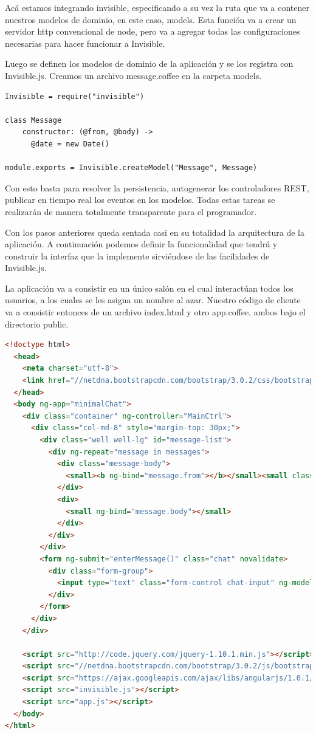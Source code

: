 \documentclass[doc,helv,longtable]{article}
\begin{document}
Acá estamos integrando invisible, especificando a su vez la ruta que va a contener nuestros modelos de dominio, en este caso, models. Esta función va a crear un servidor http convencional de node, pero va a agregar todas las configuraciones necesarias para hacer funcionar a Invisible.

Luego se definen los modelos de dominio de la aplicación y se los registra con Invisible.js. Creamos un archivo message.coffee en la carpeta models.

\begin{lstlisting}
Invisible = require("invisible")

class Message
    constructor: (@from, @body) ->
      @date = new Date()

module.exports = Invisible.createModel("Message", Message)
\end{lstlisting}

Con esto basta para resolver la persistencia, autogenerar los controladores REST, publicar en tiempo real los eventos en los modelos. Todas estas tareas se realizarán de manera totalmente transparente para el programador. 

Con los pasos anteriores queda sentada casi en su totalidad la arquitectura de la aplicación. A continuación podemos definir la funcionalidad que tendrá y construir la interfaz que la implemente sirviéndose de las facilidades de Invisible.js.

La aplicación va a consistir en un único salón en el cual interactúan todos los usuarios, a los cuales se les asigna un nombre al azar. Nuestro código de cliente va a consistir entonces de un archivo index.html y otro app.coffee, ambos bajo el directorio public.

\begin{lstlisting}[language=html]
<!doctype html>
  <head>
    <meta charset="utf-8">
    <link href="//netdna.bootstrapcdn.com/bootstrap/3.0.2/css/bootstrap.min.css" rel="stylesheet">
  </head>
  <body ng-app="minimalChat">
    <div class="container" ng-controller="MainCtrl">
      <div class="col-md-8" style="margin-top: 30px;">
        <div class="well well-lg" id="message-list"> 
          <div ng-repeat="message in messages">
            <div class="message-body">
              <small><b ng-bind="message.from"></b></small><small class="pull-right text-muted" ng-bind="message.date|date:'short'"></small><br/>
            </div>
            <div>
              <small ng-bind="message.body"></small>
            </div>
          </div>
        </div>
        <form ng-submit="enterMessage()" class="chat" novalidate>
          <div class="form-group">
            <input type="text" class="form-control chat-input" ng-model="message" required placeholder="Enter message" autofocus>
          </div>    
        </form>
      </div>
    </div>

    <script src="http://code.jquery.com/jquery-1.10.1.min.js"></script>
    <script src="//netdna.bootstrapcdn.com/bootstrap/3.0.2/js/bootstrap.min.js"></script>
    <script src="https://ajax.googleapis.com/ajax/libs/angularjs/1.0.1/angular.min.js"></script>
    <script src="invisible.js"></script>
    <script src="app.js"></script>
  </body>
</html>
\end{lstlisting}
\end{document}
